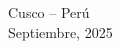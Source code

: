 \begin{titlepage}
\begin{center}
	
	\vspace{0.2cm}

    \Large{Cusco -- Per\'u \\
    Septiembre, 2025}
    
  \end{center}
\end{titlepage}
